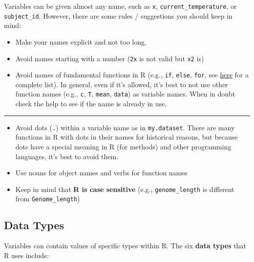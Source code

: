 \documentclass[
]{article}
\providecommand{\tightlist}{%
  \setlength{\itemsep}{0pt}\setlength{\parskip}{0pt}}
\begin{document}
Variables can be given almost any name, such as \texttt{x},
\texttt{current\_temperature}, or \texttt{subject\_id}. However, there
are some rules / suggestions you should keep in mind:

\begin{itemize}
\tightlist
\item
  Make your names explicit and not too long.
\item
  Avoid names starting with a number (\texttt{2x} is not valid but
  \texttt{x2} is)
\item
  Avoid names of fundamental functions in R (e.g., \texttt{if},
  \texttt{else}, \texttt{for}, see
  \href{https://statisticsglobe.com/r-functions-list/}{here} for a
  complete list). In general, even if it's allowed, it's best to not use
  other function names (e.g., \texttt{c}, \texttt{T}, \texttt{mean},
  \texttt{data}) as variable names. When in doubt check the help to see
  if the name is already in use.
\end{itemize}

\begin{center}\rule{0.5\linewidth}{0.5pt}\end{center}

\begin{itemize}
\tightlist
\item
  Avoid dots (\texttt{.}) within a variable name as in
  \texttt{my.dataset}. There are many functions in R with dots in their
  names for historical reasons, but because dots have a special meaning
  in R (for methods) and other programming languages, it's best to avoid
  them.
\item
  Use nouns for object names and verbs for function names
\item
  Keep in mind that \textbf{R is case sensitive} (e.g.,
  \texttt{genome\_length} is different from \texttt{Genome\_length})
\end{itemize}

\hypertarget{data-types}{%
\subsection{Data Types}\label{data-types}}

Variables can contain values of specific types within R. The six
\textbf{data types} that R uses include:
\end{document}
